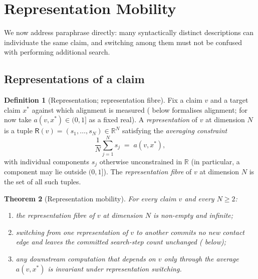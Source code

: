\documentclass[11pt,twocolumn,a4paper]{article}
\theoremstyle{thmstyle}
\newtheorem{theorem}{Theorem}[section]
\theoremstyle{definition}
\newtheorem{definition}[theorem]{Definition}
\theoremstyle{remark}
\newcommand{\R}{\mathbb{R}}
\newcommand{\Rep}{\mathsf{R}}
\begin{document}
\section{Representation Mobility}
\label{sec:representation}

We now address paraphrase directly: many syntactically distinct
descriptions can individuate the same claim, and switching among them
must not be confused with performing additional search.

\subsection{Representations of a claim}

\begin{definition}[Representation; representation fibre]
\label{def:representation}
Fix a claim $v$ and a target claim $x^{\ast}$ against which alignment is
measured ( below formalises alignment; for now take
$a(v,x^{\ast})\in(0,1]$ as a fixed real). A \emph{representation} of $v$ at
dimension $N$ is a tuple $\Rep(v)=(s_1,\dots,s_N)\in\R^{N}$ satisfying the
\emph{averaging constraint}
\[
\frac{1}{N}\sum_{j=1}^{N} s_j \;=\; a(v,x^{\ast}),
\]
with individual components $s_j$ otherwise unconstrained in $\R$ (in
particular, a component may lie outside $(0,1]$). The \emph{representation
fibre} of $v$ at dimension $N$ is the set of all such tuples.
\end{definition}

\begin{theorem}[Representation mobility]
\label{thm:rep-mobility}
For every claim $v$ and every $N\ge2$:
\begin{enumerate}[label=\textup{(\roman*)},leftmargin=2.2em]
\item the representation fibre of $v$ at dimension $N$ is non-empty and
infinite;
\item switching from one representation of $v$ to another commits no new
contact edge and leaves the committed search-step count unchanged
( below);
\item any downstream computation that depends on $v$ only through the
average $a(v,x^{\ast})$ is invariant under representation switching.
\end{enumerate}
\end{theorem}
\end{document}
